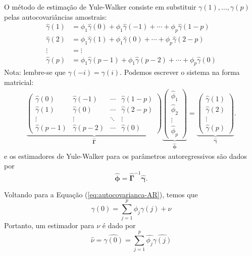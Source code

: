 \documentclass[
  letterpaper,
  DIV=11,
  numbers=noendperiod]{scrartcl}
\theoremstyle{plain}
\theoremstyle{plain}
\theoremstyle{definition}
\theoremstyle{definition}
\theoremstyle{remark}
\begin{document}
O método de estimação de Yule-Walker consiste em substituir
\(\gamma(1),\ldots,\gamma(p)\) pelas autocovariâncias amostrais:
\[\begin{align*}
\hat{\gamma}(1) &= \phi_1\hat{\gamma}(0) + \phi_1\hat{\gamma}(-1) + \cdots + \phi_p\hat{\gamma}(1-p) \\ 
\hat{\gamma}(2) &= \phi_1\hat{\gamma}(1) + \phi_1\hat{\gamma}(0)  + \cdots + \phi_p\hat{\gamma}(2-p) \\ 
\vdots &= \vdots \\
\hat{\gamma}(p) &= \phi_1\hat{\gamma}(p-1) + \phi_1\hat{\gamma}(p-2)  + \cdots + \phi_p\hat{\gamma}(0)
\end{align*}\] Nota: lembre-se que \(\gamma(-i)=\gamma(i)\). Podemos
escrever o sistema na forma matricial: \[\begin{align*}
    \underbrace{\left(
    \begin{array}{cccc}
\hat{\gamma}(0) & \hat{\gamma}(-1) & \cdots & \hat{\gamma}(1-p) \\ 
\hat{\gamma}(1) & \hat{\gamma}(0)  & \cdots & \hat{\gamma}(2-p) \\ 
         \vdots & \vdots               & \ddots                & \vdots\\
\hat{\gamma}(p-1) & \hat{\gamma}(p-2) &  \cdots & \hat{\gamma}(0)   
    \end{array}\right)}_{\hat{\boldsymbol{\Gamma}}}
    \underbrace{\left( \begin{array}{c} \hat{\phi}_1 \\ \hat{\phi}_2 \\ \vdots \\ \hat{\phi}_p   \end{array}\right)}_{\hat{\boldsymbol{\phi}}}=
    \underbrace{\left( \begin{array}{c} \hat{\gamma}(1) \\ \hat{\gamma}(2) \\ \vdots \\ \hat{\gamma}(p)   \end{array}\right)}_{\hat{\boldsymbol{\gamma}}}.
    \end{align*}\] e os estimadores de Yule-Walker para os parâmetros
autoregressivos são dados por
\[\hat{\boldsymbol{\phi}}=\hat{\boldsymbol{\Gamma}}^{-1}\hat{\boldsymbol{\gamma}}.\]

Voltando para a Equação (\ref{eq:autocovarianca-AR}), temos que
\[\gamma(0)=\sum_{j=1}^{p}\phi_j \gamma(j)+\nu\] Portanto, um estimador
para \(\nu\) é dado por \[\hat{\nu}=  
  \hat{\gamma(0)}=\sum_{j=1}^{p}\hat{\phi_j}\hat{\gamma(j)}\]
\end{document}
